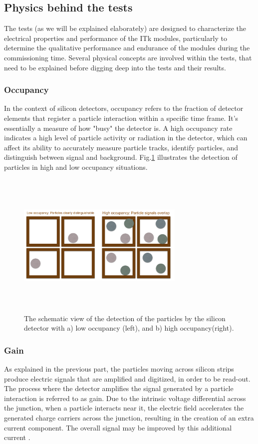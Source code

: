\subsection{Physics behind the tests}
The tests (as we will be explained elaborately) are designed to characterize the electrical properties and performance of the ITk modules, particularly to determine the qualitative performance and endurance of the modules during the commissioning time. Several physical concepts are involved within the tests, that need to be explained before digging deep into the tests and their results. 

\subsubsection{Occupancy}
In the context of silicon detectors, occupancy refers to the fraction of detector elements that register a particle interaction within a specific time frame. It's essentially a measure of how "busy" the detector is. A high occupancy rate indicates a high level of particle activity or radiation in the detector, which can affect its ability to accurately measure particle tracks, identify particles, and distinguish between signal and background. Fig.\ref{fig:occupancy} illustrates the detection of particles in high and low occupancy situations.


\begin{figure}[h]
    \centering
    \includegraphics[width=8cm,height=7cm,keepaspectratio]{Figures/modules/occupancy.PNG}
    \caption{The schematic view of the detection of the particles by the silicon detector with a) low occupancy (left), and b) high occupancy(right)\cite{materClassDetection}.}
    \label{fig:occupancy}
\end{figure}

\subsubsection{Gain}
As explained in the previous part, the particles moving across silicon strips produce electric signals that are amplified and digitized, in order to be read-out. The process where the detector amplifies the signal generated by a particle interaction is referred to as gain. 
Due to the intrinsic voltage differential across the junction, when a particle interacts near it, the electric field accelerates the generated charge carriers across the junction, resulting in the creation of an extra current component. The overall signal may be improved by this additional current \cite{barr}.


